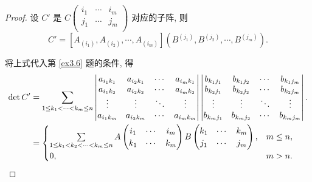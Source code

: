 \documentclass{ctexart}
\begin{document}
\begin{proof}
    设 $C'$ 是 $C\begin{pmatrix} i_1 & \cdots & i_m \\ j_1 & \cdots & j_m \\ \end{pmatrix}$ 对应的子阵, 则
    \[C'=[A_{(i_1)},A_{(i_2)},\cdots,A_{(i_m)}](B^{(j_1)},B^{(j_2)},\cdots,B^{(j_m)}).\]

    将上式代入第 \ref{ex3.6} 题的条件, 得
    \begin{align*}
        \det C' & =\sum\limits_{1\leq k_1<\cdots<k_m\leq n}\begin{vmatrix}
            a_{i_1k_1} & a_{i_2k_1} & \cdots & a_{i_mk_1} \\
            a_{i_1k_2} & a_{i_2k_2} & \cdots & a_{i_mk_2} \\
            \vdots & \vdots & \ddots & \vdots \\
            a_{i_1k_m} & a_{i_2k_m} & \cdots & a_{i_mk_m} \\
        \end{vmatrix}\begin{vmatrix}
            b_{k_1j_1} & b_{k_1j_2} & \cdots & b_{k_1j_m} \\
            b_{k_2j_1} & b_{k_2j_2} & \cdots & b_{k_2j_m} \\
            \vdots & \vdots & \ddots & \vdots \\
            b_{k_mj_1} & b_{k_mj_2} & \cdots & b_{k_mj_m} \\
        \end{vmatrix}. \\
        & =\begin{cases}
            \sum\limits_{1\leq k_1<k_2<\cdots<k_m\leq n}A\begin{pmatrix}
                i_1 & \cdots & i_m \\
                k_1 & \cdots & k_m \\
            \end{pmatrix}B\begin{pmatrix}
                k_1 & \cdots & k_m \\
                j_1 & \cdots & j_m \\
            \end{pmatrix}, & m\leq n, \\
            0, & m>n.
        \end{cases}\qedhere
    \end{align*}
\end{proof}
\end{document}
